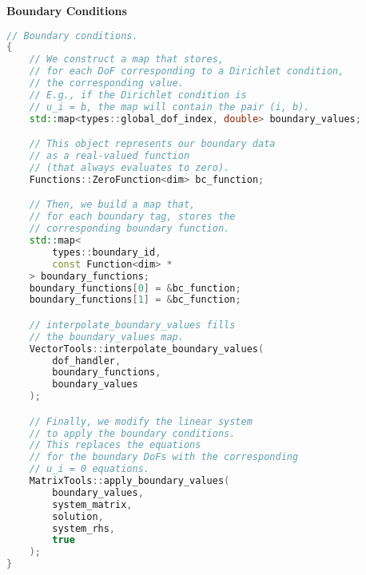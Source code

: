 \begin{flushleft}
    \textcolor{Red2}{ \textbf{Boundary Conditions}}
\end{flushleft}
\begin{lstlisting}[language=C++]
// Boundary conditions.
{
    // We construct a map that stores,
    // for each DoF corresponding to a Dirichlet condition,
    // the corresponding value.
    // E.g., if the Dirichlet condition is
    // u_i = b, the map will contain the pair (i, b).
    std::map<types::global_dof_index, double> boundary_values;

    // This object represents our boundary data
    // as a real-valued function
    // (that always evaluates to zero).
    Functions::ZeroFunction<dim> bc_function;

    // Then, we build a map that,
    // for each boundary tag, stores the
    // corresponding boundary function.
    std::map<
        types::boundary_id,
        const Function<dim> *
    > boundary_functions;
    boundary_functions[0] = &bc_function;
    boundary_functions[1] = &bc_function;

    // interpolate_boundary_values fills
    // the boundary_values map.
    VectorTools::interpolate_boundary_values(
        dof_handler,
        boundary_functions,
        boundary_values
    );

    // Finally, we modify the linear system
    // to apply the boundary conditions.
    // This replaces the equations
    // for the boundary DoFs with the corresponding
    // u_i = 0 equations.
    MatrixTools::apply_boundary_values(
        boundary_values,
        system_matrix,
        solution,
        system_rhs,
        true
    );
}\end{lstlisting}
